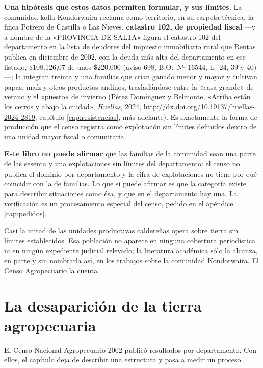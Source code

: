 \begin{cautela}
\textbf{Una hipótesis que estos datos permiten formular, y sus límites.} La comunidad kolla Kondorwaira reclama como territorio, en su carpeta técnica, la finca Potrero de Castilla o Las Nieves, \textbf{catastro 102, de propiedad fiscal} ---y a nombre de la «PROVINCIA DE SALTA» figura el catastro 102 del departamento en la lista de deudores del impuesto inmobiliario rural que Rentas publica en diciembre de 2002, con la deuda más alta del departamento en ese listado, \$108.126,07 de unos \$220.000 (aviso 698, B.O.\ Nº 16544, h.\ 24, 39 y 40)---; la integran treinta y una familias que crían ganado menor y mayor y cultivan papas, maíz y otros productos andinos, trasladándose entre la «casa grande» de verano y el «puesto» de invierno (Pérez Domínguez y Belmonte, «Arriba están los cerros y abajo la ciudad», \textit{Huellas}, 2024, \url{http://dx.doi.org/10.19137/huellas-2024-2819}; capítulo \ref{cap:resistencias}, más adelante). Es exactamente la forma de producción que el censo registra como explotación sin límites definidos dentro de una unidad mayor fiscal o comunitaria.

\textbf{Este libro no puede afirmar} que las familias de la comunidad sean una parte de las sesenta y una explotaciones sin límites del departamento: el censo no publica el dominio por departamento y la cifra de explotaciones no tiene por qué coincidir con la de familias. Lo que sí puede afirmar es que la categoría existe para describir situaciones como ésa, y que en el departamento hay una. La verificación es un procesamiento especial del censo, pedido en el apéndice \ref{cap:pedidos}.
\end{cautela}

Casi la mitad de las unidades productivas caldereñas opera sobre tierra sin límites establecidos. Esa población no aparece en ninguna cobertura periodística ni en ningún expediente judicial relevado; la literatura académica sólo la alcanza, en parte y sin nombrarla así, en los trabajos sobre la comunidad Kondorwaira. El Censo Agropecuario la cuenta.

\section{La desaparición de la tierra agropecuaria}

El Censo Nacional Agropecuario 2002 publicó resultados por departamento. Con ellos, el capítulo deja de describir una estructura y pasa a medir un proceso.


